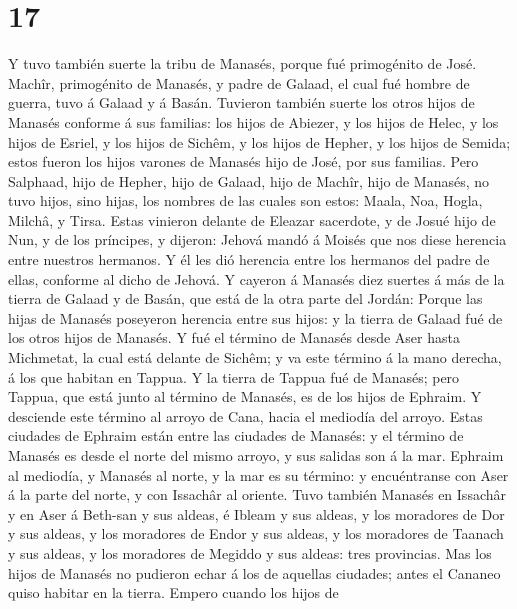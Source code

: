 \hypertarget{section-16}{%
\section{17}\label{section-16}}

 Y tuvo también suerte la tribu de Manasés, porque fué
primogénito de José. Machîr, primogénito de Manasés, y padre de Galaad,
el cual fué hombre de guerra, tuvo á Galaad y á Basán. 
Tuvieron también suerte los otros hijos de Manasés conforme á sus
familias: los hijos de Abiezer, y los hijos de Helec, y los hijos de
Esriel, y los hijos de Sichêm, y los hijos de Hepher, y los hijos de
Semida; estos fueron los hijos varones de Manasés hijo de José, por sus
familias.  Pero Salphaad, hijo de Hepher, hijo de Galaad,
hijo de Machîr, hijo de Manasés, no tuvo hijos, sino hijas, los nombres
de las cuales son estos: Maala, Noa, Hogla, Milchâ, y Tirsa.
 Estas vinieron delante de Eleazar sacerdote, y de Josué
hijo de Nun, y de los príncipes, y dijeron: Jehová mandó á Moisés que
nos diese herencia entre nuestros hermanos. Y él les dió herencia entre
los hermanos del padre de ellas, conforme al dicho de Jehová.
 Y cayeron á Manasés diez suertes á más de la tierra de
Galaad y de Basán, que está de la otra parte del Jordán: 
Porque las hijas de Manasés poseyeron herencia entre sus hijos: y la
tierra de Galaad fué de los otros hijos de Manasés.  Y fué
el término de Manasés desde Aser hasta Michmetat, la cual está delante
de Sichêm; y va este término á la mano derecha, á los que habitan en
Tappua.  Y la tierra de Tappua fué de Manasés; pero
Tappua, que está junto al término de Manasés, es de los hijos de
Ephraim.  Y desciende este término al arroyo de Cana,
hacia el mediodía del arroyo. Estas ciudades de Ephraim están entre las
ciudades de Manasés: y el término de Manasés es desde el norte del mismo
arroyo, y sus salidas son á la mar.  Ephraim al mediodía,
y Manasés al norte, y la mar es su término: y encuéntranse con Aser á la
parte del norte, y con Issachâr al oriente.  Tuvo también
Manasés en Issachâr y en Aser á Beth-san y sus aldeas, é Ibleam y sus
aldeas, y los moradores de Dor y sus aldeas, y los moradores de Endor y
sus aldeas, y los moradores de Taanach y sus aldeas, y los moradores de
Megiddo y sus aldeas: tres provincias.  Mas los hijos de
Manasés no pudieron echar á los de aquellas ciudades; antes el Cananeo
quiso habitar en la tierra.  Empero cuando los hijos de
